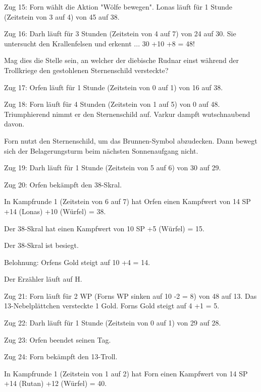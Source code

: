 \documentclass[10pt, a4paper, oneside]{book}
\begin{document}
{Zug 15: Forn wählt die Aktion "Wölfe bewegen". Lonas läuft für 1 Stunde (Zeitstein von 3 auf 4) von 45 auf 38.



Zug 16: Darh läuft für 3 Stunden (Zeitstein von 4 auf 7) von 24 auf 30. Sie untersucht den Krallenfelsen und erkennt ... 30 +10 +8 = 48!

Mag dies die Stelle sein, an welcher der diebische Rudnar einst während der Trollkriege den gestohlenen Sternenschild versteckte?



Zug 17: Orfen läuft für 1 Stunde (Zeitstein von 0 auf 1) von 16 auf 38.



Zug 18: Forn läuft für 4 Stunden (Zeitstein von 1 auf 5) von 0 auf 48. Triumphierend nimmt er den Sternenschild auf. Varkur dampft wutschnaubend davon.

Forn nutzt den Sternenschild, um das Brunnen-Symbol abzudecken. Dann bewegt sich der Belagerungsturm beim nächsten Sonnenaufgang nicht.



Zug 19: Darh läuft für 1 Stunde (Zeitstein von 5 auf 6) von 30 auf 29.



Zug 20: Orfen bekämpft den 38-Skral.

In Kampfrunde 1 (Zeitstein von 6 auf 7) hat Orfen einen Kampfwert von 14 SP +14 (Lonas) +10 (Würfel) = 38.

Der 38-Skral hat einen Kampfwert von 10 SP +5 (Würfel) = 15.

Der 38-Skral ist besiegt.

Belohnung: Orfens Gold steigt auf 10 +4 = 14.

Der Erzähler läuft auf H.



Zug 21: Forn läuft für 2 WP (Forns WP sinken auf 10 -2 = 8) von 48 auf 13. Das 13-Nebelplättchen versteckte 1 Gold. Forns Gold steigt auf 4 +1 = 5.



Zug 22: Darh läuft für 1 Stunde (Zeitstein von 0 auf 1) von 29 auf 28.



Zug 23: Orfen beendet seinen Tag.



Zug 24: Forn bekämpft den 13-Troll.

In Kampfrunde 1 (Zeitstein von 1 auf 2) hat Forn einen Kampfwert von 14 SP +14 (Rutan) +12 (Würfel) = 40.

}
\end{document}
